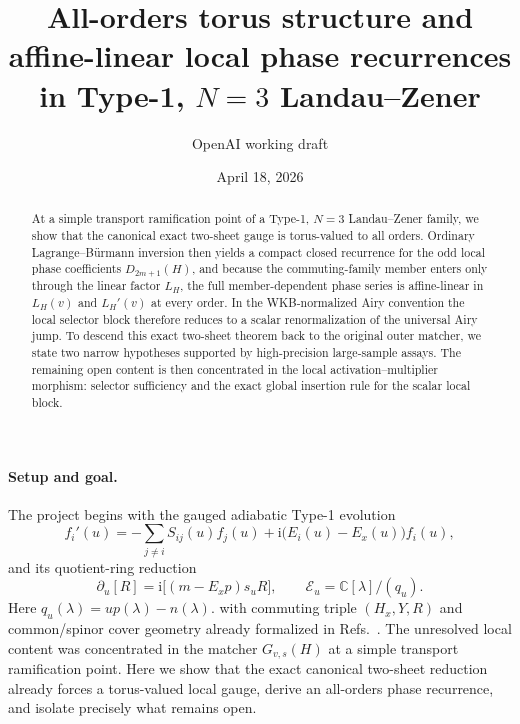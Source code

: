 \documentclass[aps,prl,reprint,superscriptaddress,nofootinbib]{revtex4-2}
\newcommand{\ii}{\mathrm{i}}
\newcommand{\LH}{L_H}
\begin{document}
\title{All-orders torus structure and affine-linear local phase recurrences in Type-1, $N=3$ Landau--Zener}
\author{OpenAI working draft}
\date{April 18, 2026}
\begin{abstract}
At a simple transport ramification point of a Type-1, $N=3$ Landau--Zener family, we show that the canonical exact two-sheet gauge is torus-valued to all orders. Ordinary Lagrange--B\"urmann inversion then yields a compact closed recurrence for the odd local phase coefficients $D_{2m+1}(H)$, and because the commuting-family member enters only through the linear factor $\LH$, the full member-dependent phase series is affine-linear in $\LH(v)$ and $\LH'(v)$ at every order. In the WKB-normalized Airy convention the local selector block therefore reduces to a scalar renormalization of the universal Airy jump. To descend this exact two-sheet theorem back to the original outer matcher, we state two narrow hypotheses supported by high-precision large-sample assays. The remaining open content is then concentrated in the local activation--multiplier morphism: selector sufficiency and the exact global insertion rule for the scalar local block.
\end{abstract}
\maketitle

\paragraph*{Setup and goal.}
The project begins with the gauged adiabatic Type-1 evolution
\begin{equation}
 f_i'(u)=-\sum_{j\neq i}S_{ij}(u)f_j(u)+\ii\bigl(E_i(u)-E_x(u)\bigr)f_i(u),
\end{equation}
and its quotient-ring reduction
\begin{equation}
 \partial_u[R]=\ii\big[(m-E_xp)s_uR\big],\qquad \mathcal E_u=\mathbb C[\lambda]/(q_u).
\end{equation}
Here $q_u(\lambda)=up(\lambda)-n(\lambda)$.
with commuting triple $(H_x,Y,R)$ and common/spinor cover geometry already formalized in Refs.~. The unresolved local content was concentrated in the matcher $G_{v,s}(H)$ at a simple transport ramification point. Here we show that the exact canonical two-sheet reduction already forces a torus-valued local gauge, derive an all-orders phase recurrence, and isolate precisely what remains open.
\end{document}
